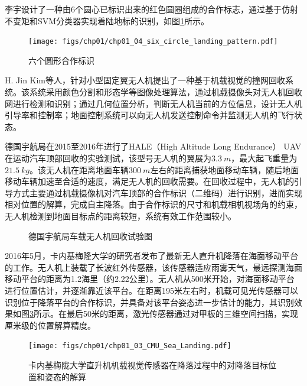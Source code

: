 李宇\cite{Li_Master_2012}设计了一种由6个圆心已标识出来的红色圆圈组成的合作标志，通过基于仿射不变矩和SVM分类器实现着陆地标的识别，如图\ref{fig:chp01_04_six_circle_landing_pattern}所示。
\begin{figure}[!tb]   
	\centering	
	\texttt{[image: figs/chp01/chp01\_04\_six\_circle\_landing\_pattern.pdf]}
	\caption{六个圆形合作标识}
	\label{fig:chp01_04_six_circle_landing_pattern}
\end{figure}

H. Jin Kim等人\cite{kim2013fully}，针对小型固定翼无人机提出了一种基于机载视觉的撞网回收系统。该系统采用颜色分割和形态学等图像处理算法，通过机载摄像头对无人机回收网进行检测和识别；通过几何位置分析，判断无人机当前的方位信息，设计无人机引导率和控制率；地面控制系统可以向无人机发送控制命令并监测无人机的飞行状态。

德国宇航局在2015至2016年进行了HALE（High Altitude Long Endurance） UAV在运动汽车顶部回收的实验测试，该型号无人机的翼展为$3.3\ m$，最大起飞重量为$21.5\ kg$。该无人机在距离地面车辆$300\ m$左右的距离捕获地面移动车辆，随后地面移动车辆加速至合适的速度，满足无人机的回收需要。在回收过程中，无人机的引导方式主要通过机载摄像机对汽车顶部的合作标识（二维码）进行识别，进而实现相对位置的解算，完成自主降落\cite{Muskardin2016}。由于合作标识的尺寸和机载相机视场角的约束，无人机检测到地面目标点的距离较短，系统有效工作范围较小。
\begin{figure}[htb]
	\centering%
	\hspace{0em}%
	\caption{德国宇航局车载无人机回收试验图}
	\label{fig:07_ILS}
\end{figure}

2016年5月，卡内基梅隆大学的研究者发布了最新无人直升机降落在海面移动平台\cite{Grocholsky2016}的工作。无人机上装载了长波红外传感器，该传感器适应雨雾天气，最远探测海面移动平台的距离为1.2海里（约2.22公里）。无人机从500米开始，对海面移动平台进行位置估计，并逐渐靠近该平台。在距离195米左右时，机载可见光传感器可以识别位于降落平台的合作标识，并具备对该平台姿态进一步估计的能力，其识别效果如图\ref{fig:chp01_03_CMU_Sea_Landing}所示。在最后50米的距离，激光传感器通过对甲板的三维空间扫描，实现厘米级的位置解算精度。

\begin{figure}[htb]   
	\centering
	\texttt{[image: figs/chp01/chp01\_03\_CMU\_Sea\_Landing.pdf]}
	\caption{卡内基梅陇大学直升机机载视觉传感器在降落过程中的对降落目标位置和姿态的解算}
	\label{fig:chp01_03_CMU_Sea_Landing}
\end{figure}

